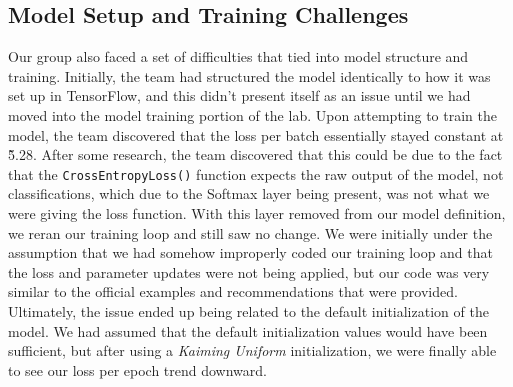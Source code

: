 \documentclass[letterpaper,twocolumn,10pt]{article}
\begin{document}
\subsection{Model Setup and Training Challenges}
Our group also faced a set of difficulties that tied into model structure and training. Initially, the team had structured the model identically to how it was set up in TensorFlow, and this didn't present itself as an issue until we had moved into the model training portion of the lab. Upon attempting to train the model, the team discovered that the loss per batch essentially stayed constant at \~5.28. After some research, the team discovered that this could be due to the fact that the \verb|CrossEntropyLoss()| function expects the raw output of the model, not classifications, which due to the Softmax layer being present, was not what we were giving the loss function. With this layer removed from our model definition, we reran our training loop and still saw no change. We were initially under the assumption that we had somehow improperly coded our training loop and that the loss and parameter updates were not being applied, but our code was very similar to the official examples and recommendations that were provided. Ultimately, the issue ended up being related to the default initialization of the model. We had assumed that the default initialization values would have been sufficient, but after using a \textit{Kaiming Uniform} initialization, we were finally able to see our loss per epoch trend downward.

{\footnotesize
}
\end{document}
